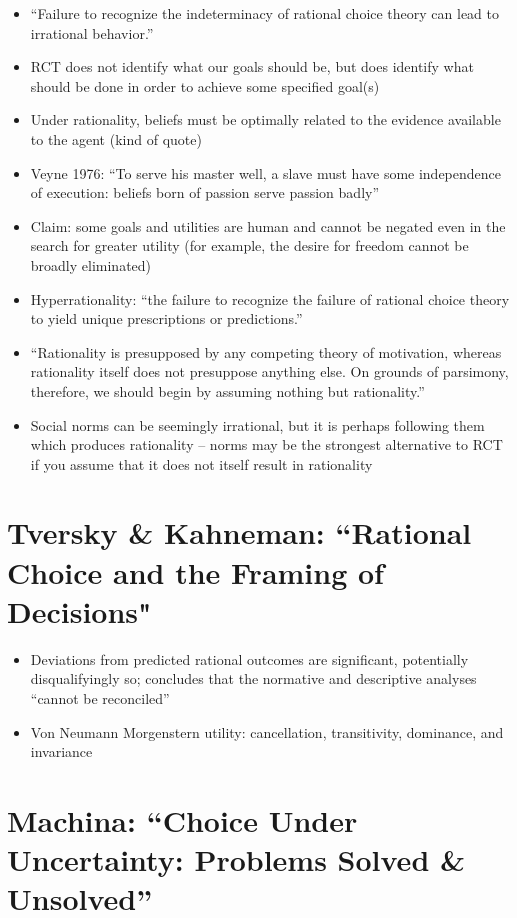 \documentclass[12pt]{article}
\begin{document}
\begin{itemize}
    \item ``Failure to recognize the indeterminacy of rational choice theory can lead to irrational behavior.''
    \item RCT does not identify what our goals should be, but does identify what should be done in order to achieve some specified goal(s)
    \item Under rationality, beliefs must be optimally related to the evidence available to the agent (kind of quote)
    \item Veyne 1976: ``To serve his master well, a slave must have some independence of execution: beliefs born of passion serve passion badly''
    \item Claim: some goals and utilities are human and cannot be negated even in the search for greater utility (for example, the desire for freedom cannot be broadly eliminated)
    \item Hyperrationality: ``the failure to recognize the failure of rational choice theory to yield unique prescriptions or predictions.''
    \item ``Rationality is presupposed by any competing theory of motivation, whereas rationality itself does not presuppose anything else. On grounds of parsimony, therefore, we should begin by assuming nothing but rationality.''
    \item Social norms can be seemingly irrational, but it is perhaps following them which produces rationality -- norms may be the strongest alternative to RCT if you assume that it does not itself result in rationality
\end{itemize}


\section{Tversky \& Kahneman: ``Rational Choice and the Framing of Decisions"}

\begin{itemize}
    \item Deviations from predicted rational outcomes are significant, potentially disqualifyingly so; concludes that the normative and descriptive analyses ``cannot be reconciled''
    \item Von Neumann Morgenstern utility: cancellation, transitivity, dominance, and invariance
\end{itemize}


\section{Machina: ``Choice Under Uncertainty: Problems Solved \& Unsolved''}
\end{document}
